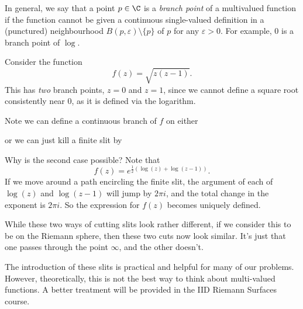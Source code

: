 \documentclass[a4paper]{article}
\begin{document}
In general, we say that a point $p \in \C $ is a \emph{branch point} of a multivalued function if the function cannot be given a continuous single-valued definition in a (punctured) neighbourhood $B(p, \varepsilon) \setminus \{p\}$ of $p$ for any $\varepsilon > 0$. For example, $0$ is a branch point of $\log$.

\begin{eg}
  Consider the function
  \[
    f(z) = \sqrt{z(z - 1)}.
  \]
  This has \emph{two} branch points, $z = 0$ and $z = 1$, since we cannot define a square root consistently near $0$, as it is defined via the logarithm.
\end{eg}

Note we can define a continuous branch of $f$ on either
\begin{center}
\end{center}
or we can just kill a finite slit by
\begin{center}
\end{center}
Why is the second case possible? Note that
\[
  f(z) = e^{\frac{1}{2}(\log(z) + \log(z - 1))}.
\]
If we move around a path encircling the finite slit, the argument of each of $\log(z)$ and $\log(z - 1)$ will jump by $2\pi i$, and the total change in the exponent is $2\pi i$. So the expression for $f(z)$ becomes uniquely defined.

While these two ways of cutting slits look rather different, if we consider this to be on the Riemann sphere, then these two cuts now look similar. It's just that one passes through the point $\infty$, and the other doesn't.

The introduction of these slits is practical and helpful for many of our problems. However, theoretically, this is not the best way to think about multi-valued functions. A better treatment will be provided in the IID Riemann Surfaces course.
\end{document}
